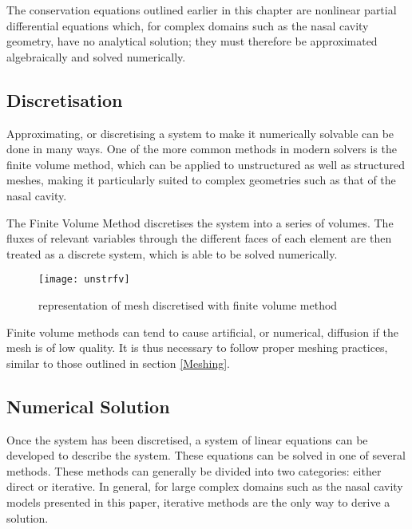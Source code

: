 The conservation equations outlined earlier in this chapter are nonlinear partial differential equations which, for complex domains such as the nasal cavity geometry, have no analytical solution; they must therefore be approximated algebraically and solved numerically.

\subsection{Discretisation}

Approximating, or discretising a system to make it numerically solvable can be done in many ways. One of the more common methods in modern solvers is the finite volume method, which can be applied to unstructured as well as structured meshes, making it particularly suited to complex geometries such as that of the nasal cavity.

The Finite Volume Method discretises the system into a series of volumes. The fluxes of relevant variables through the different faces of each element are then treated as a discrete system, which is able to be solved numerically.

\begin{figure}
  \texttt{[image: unstrfv]}
  \caption{representation of mesh discretised with finite volume method}
  \label{usfv}
\end{figure}

Finite volume methods can tend to cause artificial, or numerical, diffusion if the mesh is of low quality. It is thus necessary to follow proper meshing practices, similar to those outlined in section \ref{Meshing}.

\subsection{Numerical Solution}

Once the system has been discretised, a system of linear equations can be developed to describe the system. These equations can be solved in one of several methods. These methods can generally be divided into two categories: either direct or iterative. In general, for large complex domains such as the nasal cavity models presented in this paper, iterative methods are the only way to derive a solution.
